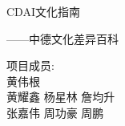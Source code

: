 \documentclass[12pt, notitlepage]{ctexbook}
\begin{document}
	\pagestyle{plain}
	
	\cleardoublepage
	\thispagestyle{empty}
	\begin{titlepage}
	\centering
	\vspace*{6cm}
	\noindent
	\center
	\begin{minipage}{0.7\linewidth}
	\heiti CDAI文化指南\par
	\vspace{12pt}
	\songti ——中德文化差异百科\par
	\vspace{8cm}
	\heiti{}
	\raggedright
	项目成员:\\
	
	\vspace*{1em}
	黄伟根\\
	黄耀鑫 \hspace{1em} 杨星林 \hspace{1em} 詹均升 \\
	张嘉伟 \hspace{1em} 周功豪 \hspace{1em} 周鹏 \\
	\end{minipage}
	\end{titlepage}

	\cleardoublepage
	

	\tableofcontents
	\cleardoublepage
	\pagestyle{headings}	
	
	
	
\end{document}
